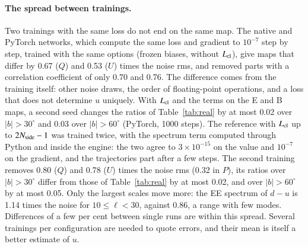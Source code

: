 \documentclass{aa}
\newcommand{\nside}{N_{\rm side}}
\begin{document}
\paragraph{The spread between trainings.} Two trainings with the same loss do not end on the same map. The native and PyTorch networks, which compute the same loss and gradient to $10^{-7}$ step by step, trained with the same options (frozen biases, without $L_{\rm cl}$), give maps that differ by 0.67 ($Q$) and 0.53 ($U$) times the noise rms, and removed parts with a correlation coefficient of only 0.70 and 0.76. The difference comes from the training itself: other noise draws, the order of floating-point operations, and a loss that does not determine $u$ uniquely. With $L_{\rm cl}$ and the terms on the E and B maps, a second seed changes the ratios of Table~\ref{tab:real} by at most 0.02 over $|b|>30^\circ$ and 0.03 over $|b|>60^\circ$ (PyTorch, 1000 steps). The reference with $L_{\rm cl}$ up to $2\nside-1$ was trained twice, with the spectrum term computed through Python and inside the engine: the two agree to $3\times10^{-15}$ on the value and $10^{-7}$ on the gradient, and the trajectories part after a few steps. The second training removes 0.80 ($Q$) and 0.78 ($U$) times the noise rms (0.32 in $P$), its ratios over $|b|>30^\circ$ differ from those of Table~\ref{tab:real} by at most 0.02, and over $|b|>60^\circ$ by at most 0.05. Only the largest scales move more: the EE spectrum of $d-u$ is 1.14 times the noise for $10\le\ell<30$, against 0.86, a range with few modes. Differences of a few per cent between single runs are within this spread. Several trainings per configuration are needed to quote errors, and their mean is itself a better estimate of $u$.
\end{document}
